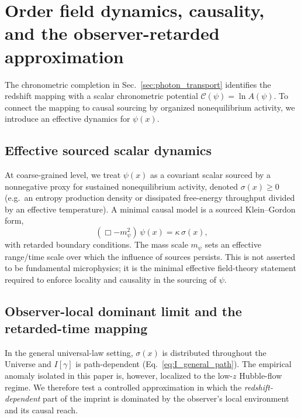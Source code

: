 \documentclass[10pt]{article}
\begin{document}
\section{Order field dynamics, causality, and the observer-retarded approximation}
\label{sec:psi_dynamics_main}

The chronometric completion in Sec.~\ref{sec:photon_transport} identifies the redshift mapping with a scalar
chronometric potential \(\mathcal{C}(\psi)=\ln A(\psi)\). To connect the mapping to causal sourcing by organized
nonequilibrium activity, we introduce an effective dynamics for \(\psi(x)\).

\subsection{Effective sourced scalar dynamics}
\label{sec:psi_dynamics_eq}

At coarse-grained level, we treat \(\psi(x)\) as a covariant scalar sourced by a nonnegative proxy for sustained
nonequilibrium activity, denoted \(\sigma(x)\ge 0\) (e.g.\ an entropy production density or dissipated free-energy
throughput divided by an effective temperature). A minimal causal model is a sourced Klein--Gordon form,
\begin{equation}
(\Box - m_\psi^2)\,\psi(x) = \kappa\,\sigma(x),
\label{eq:psi_kg}
\end{equation}
with retarded boundary conditions. The mass scale \(m_\psi\) sets an effective range/time scale over which the
influence of sources persists. This is not asserted to be fundamental microphysics; it is the minimal effective
field-theory statement required to enforce locality and causality in the sourcing of \(\psi\).

\subsection{Observer-local dominant limit and the retarded-time mapping}
\label{sec:psi_retarded}

In the general universal-law setting, \(\sigma(x)\) is distributed throughout the Universe and \(I[\gamma]\) is
path-dependent (Eq.~\eqref{eq:I_general_path}). The empirical anomaly isolated in this paper is, however,
localized to the low-$z$ Hubble-flow regime. We therefore test a controlled approximation in which the
\emph{redshift-dependent} part of the imprint is dominated by the observer’s local environment and its
causal reach.
\end{document}
